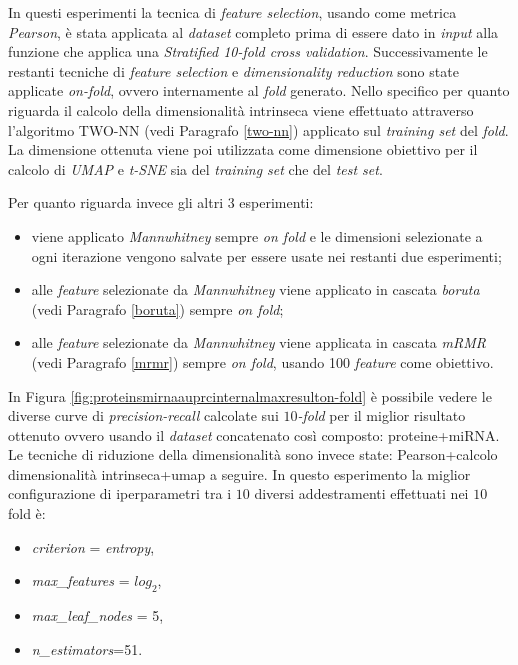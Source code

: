 \documentclass[12pt,italian]{report}
\begin{document}
	In questi esperimenti la tecnica di \textit{feature selection}, usando come metrica \textit{Pearson}, è stata applicata al \textit{dataset} completo prima di essere dato in \textit{input} alla funzione che applica una \textit{Stratified 10-fold cross validation}. Successivamente le restanti tecniche di \textit{feature selection} e \textit{dimensionality reduction} sono state applicate \textit{on-fold}, ovvero internamente al \textit{fold} generato. Nello specifico per quanto riguarda il calcolo della dimensionalità intrinseca viene effettuato attraverso l'algoritmo TWO-NN (vedi Paragrafo \ref{two-nn}) applicato sul \textit{training set} del \textit{fold}. La dimensione ottenuta viene poi utilizzata come dimensione obiettivo per il calcolo di \textit{UMAP} e \textit{t-SNE} sia del \textit{training set} che del \textit{test set}.
	
	Per quanto riguarda invece gli altri 3 esperimenti:
	\begin{itemize}
		\item viene applicato \textit{Mannwhitney} sempre \textit{on fold} e le dimensioni selezionate a ogni iterazione vengono salvate per essere usate nei restanti due esperimenti;
		\item alle \textit{feature} selezionate da \textit{Mannwhitney} viene applicato in cascata \textit{boruta} (vedi Paragrafo \ref{boruta}) sempre \textit{on fold};
		\item alle \textit{feature} selezionate da \textit{Mannwhitney} viene applicata in cascata \textit{mRMR} (vedi Paragrafo \ref{mrmr}) sempre \textit{on fold}, usando 100 \textit{feature} come obiettivo.
	\end{itemize}
	
	In Figura \ref{fig:proteinsmirnaauprcinternalmaxresulton-fold} è possibile vedere le  diverse curve di \textit{precision-recall} calcolate sui $10$\textit{-fold} per il miglior risultato ottenuto ovvero usando il \textit{dataset} concatenato così composto: proteine+miRNA. Le tecniche di riduzione della dimensionalità sono invece state: Pearson+calcolo dimensionalità intrinseca+umap a seguire. 
	In questo esperimento la miglior configurazione di iperparametri tra i $10$ diversi addestramenti effettuati nei $10$ fold è:
	\begin{itemize}
		\item \textit{criterion} = \textit{entropy},
		\item \textit{max\_features} = $log_2$,
		\item \textit{max\_leaf\_nodes} = 5,
		\item \textit{n\_estimators}=51.
	\end{itemize}
	
\end{document}
